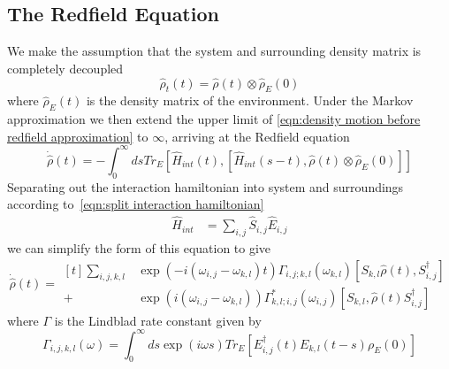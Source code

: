 \subsection{The Redfield Equation}\label{sec:the redfield assumption}
We make the assumption that the
system and surrounding density
matrix is completely
decoupled~\cite{theory_open_quantum_systems}
\begin{equation}
    \hat{\rho}_t(t) = \hat{\rho}(t) \otimes \hat{\rho}_E(0)
\end{equation}
where \(\hat{\rho}_E(t)\) is the
density matrix of the environment.
Under the Markov approximation
we then extend the upper limit
of \cref{eqn:density motion before redfield approximation}
to \(\infty \), arriving at the Redfield
equation
\begin{equation}
    \dot{\hat{\rho}}(t) =
    - \int_0^{\infty} ds
    Tr_{E}[\hat{H}_{int}(t),
            [\hat{H}_{int}(s-t),
                    \hat{\rho}(t) \otimes \hat{\rho}_E(0)]]
\end{equation}
Separating out the interaction hamiltonian
into system and surroundings according
to~\cref{eqn:split interaction hamiltonian}
\begin{align}
    \hat{H}_{int} & = \sum_{i,j} \hat{S}_{i,j} \hat{E}_{i,j}
\end{align}
we can simplify the form of this equation\cite{Manzano_2020} to give
\begin{equation}
    \dot{\hat{\rho{}}}(t) = \begin{aligned}[t]
        \sum_{i,j,k, l} &
        \exp{(-i(\omega_{i,j}-\omega_{k,l})t)}
        \Gamma_{i,j;k, l}(\omega_{k,l})
        [S_{k, l}\hat{\rho}(t),
        S^\dagger_{i,j}]  \\
        +               &
        \exp{(i(\omega_{i,j}-\omega_{k,l}))}
        \Gamma^*_{k, l; i,j}(\omega_{i,j})
        [S_{k, l},
            \hat{\rho}(t) S^\dagger_{i,j}]
    \end{aligned} \label{eqn:redfield equation gamma form}
\end{equation}
where \(\Gamma \) is the
Lindblad rate constant given by
\begin{equation}
    \Gamma_{i,j, k,l}(\omega) =
    \int_0^\infty{}{
    ds \exp{(i\omega{}s)}
    Tr_{E}[E^\dagger_{i,j}(t)E_{k,l}(t-s)\rho_E(0)]
    }\label{eqn:gamma definition}
\end{equation}

